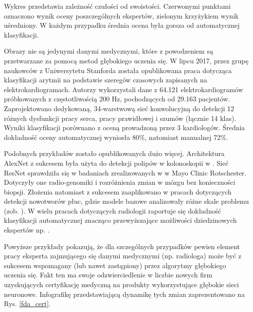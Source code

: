 Wykres przedstawia zależność czułości od swoistości. Czerwonymi punktami oznaczono wynik oceny poszczególnych ekspertów, zielonym krzyżykiem wynik uśredniony. W każdym przypadku średnia ocena była gorsza od automatycznej klasyfikacji.

Obrazy nie są jedynymi danymi medycznymi, które z powodzeniem są przetwarzane za pomocą metod głębokiego uczenia się. W lipcu 2017, przez grupę naukowców z Uniwersytetu Stanforda została opublikowana praca \cite{2017arXiv170701836R} dotycząca klasyfikacji arytmii na podstawie szeregów czasowych zapisanych na elektrokardiogramach. Autorzy wykorzystali dane z 64.121 elektrokardiogramów próbkowanych z częstotliwością 200 Hz, pochodzących od 29.163 pacjentów. Zaprojektowano dedykowaną, 34-warstwową sieć konwolucyjną do detekcji 12 różnych dysfunkcji pracy serca, pracy prawidłowej i szumów (łącznie 14 klas). Wyniki klasyfikacji porównano z oceną prowadzoną przez 3 kardiologów. Średnia dokładność oceny automatycznej wyniosła 80\%, natomiast manualnej 72\%.

Podobnych przykładów zostało opublikowanych dużo więcej. Architektura AlexNet z sukcesem była użyta do detekcji polipów w kolonoskopii w \cite{Tajbakhsh2016}. Sieć ResNet sprawdziła się w badaniach zrealizowanych w \cite{Erickson2018} w Mayo Clinic Rotschester. Dotyczyły one radio-genomiki i rozróżnienia zmian w mózgu bez konieczności biopsji. Złożenia natomiast z sukcesem zaaplikowano w pracach dotyczących detekcji nowotworów płuc, gdzie modele bazowe analizowały różne skale problemu (zob. \cite{LungChalenge}). W wielu pracach dotyczących radiologii raportuje się dokładność klasyfikacji automatycznej znacząco przewyższające możliwości dziedzinowych ekspertów np. \cite{Christiansen2018, Sarraf2016, Glasser2016, 2016arXiv160605718W}.

Powyższe przykłady pokazują, że dla szczególnych przypadków pewien element pracy eksperta zajmującego się danymi medycznymi (np. radiologa) może być z sukcesem wspomagany (lub nawet zastąpiony) przez algorytmy głębokiego uczenia się. Fakt ten ma swoje odzwierciedlenie w liczbie nowych firm uzyskujących certyfikację medyczną na produkty wykorzystujące głębokie sieci neuronowe. Infografikę przedstawiającą dynamikę tych zmian zaprezentowano na Rys. \ref{fda_cert}.


